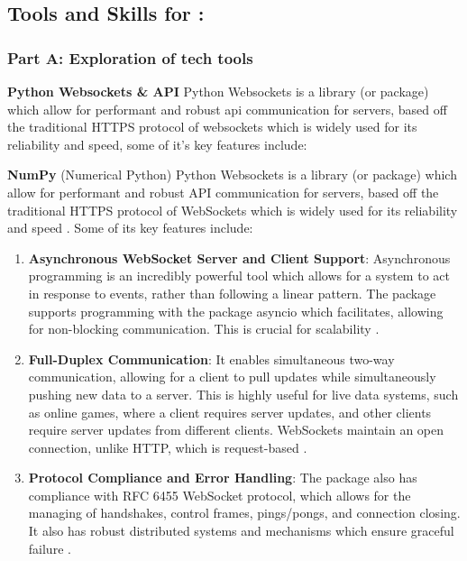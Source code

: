 \documentclass[a4paper, 11pt]{report}
\begin{document}
\subsection{Tools and Skills for \majA: \studA}

\subsubsection{Part A: Exploration of tech tools}

\textbf{Python Websockets & API}  Python Websockets is a library (or package) which allow for performant and robust api communication for servers, based off the traditional HTTPS protocol of websockets which is widely used for its reliability and speed, some of it’s key features include:

\textbf{NumPy} (Numerical Python) Python Websockets is a library (or package) which allow for performant and robust API communication for servers, based off the traditional HTTPS protocol of WebSockets which is widely used for its reliability and speed \cite{pypi_websockets}. Some of its key features include:

\begin{enumerate}
    \item \textbf{Asynchronous WebSocket Server and Client Support}: Asynchronous programming is an incredibly powerful tool which allows for a system to act in response to events, rather than following a linear pattern. The package supports programming with the package asyncio which facilitates, allowing for non-blocking communication. This is crucial for scalability \cite{obregon2023}.
    
    \item \textbf{Full-Duplex Communication}: It enables simultaneous two-way communication, allowing for a client to pull updates while simultaneously pushing new data to a server. This is highly useful for live data systems, such as online games, where a client requires server updates, and other clients require server updates from different clients. WebSockets maintain an open connection, unlike HTTP, which is request-based \cite{ably2023}.
    
    \item \textbf{Protocol Compliance and Error Handling}: The package also has compliance with RFC 6455 WebSocket protocol, which allows for the managing of handshakes, control frames, pings/pongs, and connection closing. It also has robust distributed systems and mechanisms which ensure graceful failure \cite{piehost2024}.
\end{enumerate}
\end{document}
